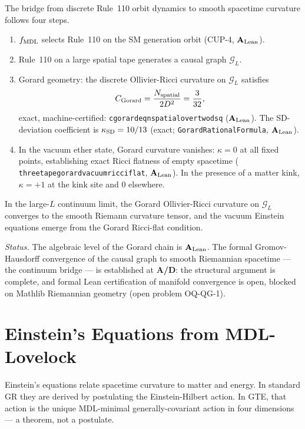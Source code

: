\documentclass[11pt,openany]{book}
\theoremstyle{remark}
\newcommand{\lean}[1]{%
  \penalty-100
  \begingroup\def\_{\textunderscore\allowbreak}\texttt{#1}\endgroup}
\newcommand{\CMCA}{\text{CMCA}}
\newcommand{\CGorard}{C_{\rm Gorard}}
\newcommand{\kSD}{\kappa_{\rm SD}}
\newcommand{\CatAL}{\ensuremath{\textbf{A}_{\rm Lean}}}
\newcommand{\CatAD}{\textbf{A/D}}
\begin{document}
The bridge from discrete Rule~110 orbit dynamics to smooth spacetime curvature follows
four steps.
\begin{enumerate}
\item $f_{\rm MDL}$ selects Rule~110 on the SM generation orbit
  (CUP-4, \CatAL).
\item Rule~110 on a large spatial tape generates a causal graph $\mathcal{G}_L$.
\item Gorard geometry: the discrete Ollivier-Ricci curvature on $\mathcal{G}_L$
  satisfies
  \begin{equation}
    \CGorard = \frac{N_{\rm spatial}}{2D^2} = \frac{3}{32},
    \label{eq:c_gorard}
  \end{equation}
  exact, machine-certified:
  \lean{c\_gorard\_eq\_n\_spatial\_over\_two\_dsq} (\CatAL).
  The SD-deviation coefficient is $\kSD = 10/13$ (exact; \lean{GorardRationalFormula},
  \CatAL).
\item In the vacuum ether state, Gorard curvature vanishes: $\kappa = 0$ at all fixed
  points, establishing exact Ricci flatness of empty spacetime
  (\lean{three\_tape\_gorard\_vacuum\_ricci\_flat}, \CatAL).
  In the presence of a matter kink, $\kappa = +1$ at the kink site and $0$ elsewhere.
\end{enumerate}
In the large-$L$ continuum limit, the Gorard Ollivier-Ricci curvature on
$\mathcal{G}_L$ converges to the smooth Riemann curvature tensor, and the vacuum
Einstein equations emerge from the Gorard Ricci-flat condition.

\textit{Status.}
The algebraic level of the Gorard chain is \CatAL.
The formal Gromov-Hausdorff convergence of the \CMCA{} causal graph to smooth
Riemannian spacetime --- the continuum bridge --- is established at \CatAD{}:
the structural argument is complete, and formal Lean certification of manifold
convergence is open, blocked on Mathlib Riemannian geometry (open problem OQ-QG-1).

\section{Einstein's Equations from MDL-Lovelock}
\label{sec:gr_lovelock}

Einstein's equations relate spacetime curvature to matter and energy.
In standard GR they are derived by postulating the Einstein-Hilbert action.
In GTE, that action is the unique MDL-minimal generally-covariant action in four
dimensions --- a theorem, not a postulate.
\end{document}
